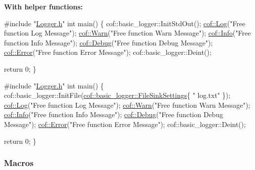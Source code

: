 {\bfseries With helper functions\+:}


\begin{DoxyCode}
\textcolor{preprocessor}{#include "\hyperlink{_logger_8h}{Logger.h}"}
\textcolor{keywordtype}{int} main()
\{
    cof::basic\_logger::InitStdOut();
    \hyperlink{_logging_function_8h_a1f56bcf4dd7901f39b3386261c75d4a5}{cof::Log}(\textcolor{stringliteral}{"Free function Log Message"});
    \hyperlink{_logging_function_8h_ac0c0af18a99bcd635fb89679890cdeaa}{cof::Warn}(\textcolor{stringliteral}{"Free function Warn Message"});
    \hyperlink{_logging_function_8h_a4d2fa4bc5cade7fdb692a0615b489997}{cof::Info}(\textcolor{stringliteral}{"Free function Info Message"});
    \hyperlink{_logging_function_8h_ac0fff05470889b9bf801966564dddb36}{cof::Debug}(\textcolor{stringliteral}{"Free function Debug Message"});
    \hyperlink{_logging_function_8h_a09fbfa2e340f6dff1804c2a19a7b34f4}{cof::Error}(\textcolor{stringliteral}{"Free function Error Message"});
    cof::basic\_logger::Deint();

    \textcolor{keywordflow}{return} 0;
\}
\end{DoxyCode}



\begin{DoxyCode}
\textcolor{preprocessor}{#include "\hyperlink{_logger_8h}{Logger.h}"}
\textcolor{keywordtype}{int} main()
\{
    cof::basic\_logger::InitFile(\hyperlink{structcof_1_1basic__logger_1_1_file_sink_settings}{cof::basic\_logger::FileSinkSettings}\{ \textcolor{stringliteral}{"
      log.txt"} \});
    \hyperlink{_logging_function_8h_a1f56bcf4dd7901f39b3386261c75d4a5}{cof::Log}(\textcolor{stringliteral}{"Free function Log Message"});
    \hyperlink{_logging_function_8h_ac0c0af18a99bcd635fb89679890cdeaa}{cof::Warn}(\textcolor{stringliteral}{"Free function Warn Message"});
    \hyperlink{_logging_function_8h_a4d2fa4bc5cade7fdb692a0615b489997}{cof::Info}(\textcolor{stringliteral}{"Free function Info Message"});
    \hyperlink{_logging_function_8h_ac0fff05470889b9bf801966564dddb36}{cof::Debug}(\textcolor{stringliteral}{"Free function Debug Message"});
    \hyperlink{_logging_function_8h_a09fbfa2e340f6dff1804c2a19a7b34f4}{cof::Error}(\textcolor{stringliteral}{"Free function Error Message"});
    cof::basic\_logger::Deint();

    \textcolor{keywordflow}{return} 0;
\}
\end{DoxyCode}


\subsubsection*{Macros}

